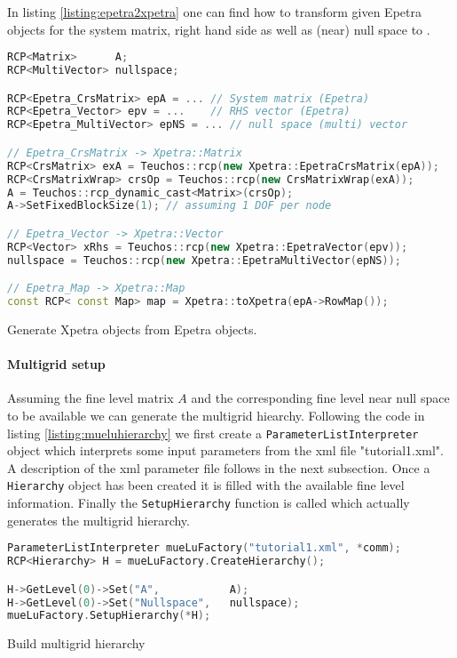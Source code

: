 In listing \ref{listing:epetra2xpetra} one can find how to transform given Epetra objects for the system matrix, right hand side as well as (near) null space to \Xpetra.
\begin{Listing}
\begin{center}
\begin{lstlisting}[language=C++,label=listing:epetra2xpetra]
RCP<Matrix>      A;
RCP<MultiVector> nullspace;

RCP<Epetra_CrsMatrix> epA = ... // System matrix (Epetra)
RCP<Epetra_Vector> epv = ...    // RHS vector (Epetra)
RCP<Epetra_MultiVector> epNS = ... // null space (multi) vector

// Epetra_CrsMatrix -> Xpetra::Matrix
RCP<CrsMatrix> exA = Teuchos::rcp(new Xpetra::EpetraCrsMatrix(epA));
RCP<CrsMatrixWrap> crsOp = Teuchos::rcp(new CrsMatrixWrap(exA));
A = Teuchos::rcp_dynamic_cast<Matrix>(crsOp);
A->SetFixedBlockSize(1); // assuming 1 DOF per node

// Epetra_Vector -> Xpetra::Vector
RCP<Vector> xRhs = Teuchos::rcp(new Xpetra::EpetraVector(epv));
nullspace = Teuchos::rcp(new Xpetra::EpetraMultiVector(epNS));

// Epetra_Map -> Xpetra::Map
const RCP< const Map> map = Xpetra::toXpetra(epA->RowMap());
\end{lstlisting}
\caption{Generate Xpetra objects from Epetra objects.}
\label{listing:epetra2xpetra}
\end{center}
\end{Listing}

\paragraph{Multigrid setup}
Assuming the fine level matrix $A$ and the corresponding fine level near null space to be available we can generate the multigrid hiearchy. Following the code in listing \ref{listing:mueluhierarchy} we first create a \verb|ParameterListInterpreter| object which interprets some input parameters from the xml file "tutorial1.xml". A description of the xml parameter file follows in the next subsection.
Once a \verb|Hierarchy| object has been created it is filled with the available fine level information. Finally the \verb|SetupHierarchy| function is called which actually generates the multigrid hierarchy.
\begin{Listing}
\begin{center}
\begin{lstlisting}[language=C++,label=listing:epetra2xpetra]
ParameterListInterpreter mueLuFactory("tutorial1.xml", *comm);
RCP<Hierarchy> H = mueLuFactory.CreateHierarchy();

H->GetLevel(0)->Set("A",           A);
H->GetLevel(0)->Set("Nullspace",   nullspace);
mueLuFactory.SetupHierarchy(*H);
\end{lstlisting}
\caption{Build multigrid hierarchy}
\label{listing:mueluhierarchy}
\end{center}
\end{Listing}

